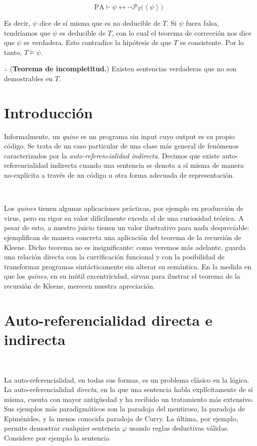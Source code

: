 \documentclass[a4paper, 12pt]{article}
\begin{document}
\begin{equation*}
  \text{PA} \vdash \psi \leftrightarrow \neg\mathcal{P}_T\big( \left< \psi \right> \big)
\end{equation*}

Es decir, $\psi$ dice de sí misma que es no deducible de $T$. Si $\psi$ fuera
falsa, tendríamos que $\psi$ es deducible de $T$, con lo cual el teorema de
corrección nos dice que $\psi$ es verdadera. Esto contradice la hipótesis de que
$T$ es consistente. Por lo tanto, $T \vDash \psi$. 

$\therefore $ (\textbf{Teorema de incompletitud.}) Existen
sentencias verdaderas que no son demostrables en $T$.

\pagebreak 

\section{Introducción}

Informalmente, un \textit{quine} es un programa sin input cuyo output es su
propio código. Se trata de un caso particular de una clase más general de
fenómenos caracterizados por la \textit{auto-referencialidad indirecta}. Decimos
que existe auto-referencialidad indirecta cuando una sentencia se denota a sí
misma de manera no-explícita a través de un código u otra forma adecuada de
representación. 

~ 

Los \textit{quines} tienen algunas aplicaciones prácticas, por ejemplo en
producción de virus, pero en rigor su valor difícilmente exceda el de una
curiosidad teórica. A pesar de esto, a nuestro juicio tienen un valor
ilustrativo para nada despreciable: ejemplifican de manera concreta una
aplicación del teorema de la recursión de Kleene. Dicho teorema no es
insignificante: como veremos más adelante, guarda una relación directa con la
currificación funcional y con la posibilidad de transformar programas
sintácticamente sin alterar su semántica. En la medida en que los
\textit{quines}, en su inútil excentricidad, sirvan para ilustrar
el teorema de la recursión de Kleene, merecen nuestra apreciación.

\section{Auto-referencialidad directa e indirecta}

~ 

La auto-referencialidad, en todas sus formas, es un problema clásico en la
lógica. La auto-referencialidad \textit{directa}, en la que una sentencia habla
explícitamente de sí misma, cuenta con mayor antigüedad y ha recibido un
tratamiento más extensivo. Sus ejemplos más paradigmáticos 
son la paradoja del mentiroso, la paradoja de Epiménides, y la menos conocida
paradoja de Curry. La última, por ejemplo, permite demostrar cualquier sentencia
$\varphi$ usando reglas deductivas válidas. Considere por ejemplo la sentencia 
\end{document}
